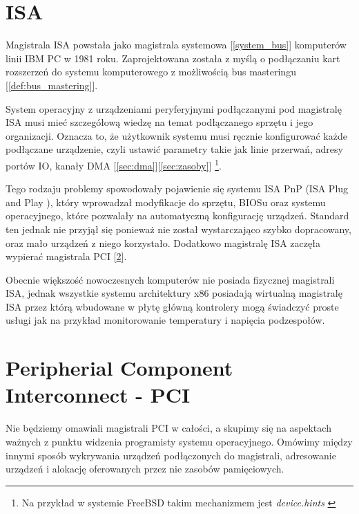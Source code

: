 \documentclass[shortabstract,inz]{iithesis}
\begin{document}
\section{ISA} %
\label{sec:isa}

Magistrala ISA \cite{def:wiki_isa} powstała jako magistrala systemowa [\ref{system_bus}] komputerów linii IBM PC w 1981 roku.
Zaprojektowana została z myślą o podłączaniu kart rozszerzeń do systemu komputerowego
z możliwością bus masteringu [\ref{def:bus_mastering}].

System operacyjny z urządzeniami peryferyjnymi podłączanymi pod magistralę ISA
musi mieć szczegółową wiedzę na temat podłączanego sprzętu i jego organizacji.
Oznacza to, że użytkownik systemu musi ręcznie konfigurować każde podłączane urządzenie,
czyli ustawić parametry takie jak linie przerwań, adresy portów IO, kanały DMA [\ref{sec:dma}][\ref{sec:zasoby}] 
\footnote{Na przykład w systemie FreeBSD takim mechanizmem jest \textit{device.hints} \cite{man:device.hints_5}}.


Tego rodzaju problemy spowodowały pojawienie się systemu ISA PnP (ISA Plug and Play \cite{def:wiki_legacy_pnp}),
który wprowadzał modyfikacje do sprzętu, BIOSu oraz systemu operacyjnego, które pozwalały
na automatyczną konfigurację urządzeń. Standard ten jednak nie przyjął się ponieważ
nie został wystarczająco szybko dopracowany, oraz mało urządzeń z niego korzystało.
Dodatkowo magistralę ISA zaczęła wypierać magistrala PCI [\ref{sec:pci}].

Obecnie większość nowoczesnych komputerów nie posiada fizycznej magistrali ISA,
jednak wszystkie systemu architektury x86 posiadają wirtualną magistralę ISA
przez którą wbudowane w płytę główną kontrolery mogą świadczyć proste 
usługi jak na przykład monitorowanie temperatury i napięcia podzespołów.

\section{Peripherial Component Interconnect - PCI} %
\label{sec:pci}


Nie będziemy omawiali magistrali PCI w całości, a skupimy się na
aspektach ważnych z punktu widzenia programisty systemu
operacyjnego. Omówimy między innymi sposób wykrywania urządzeń podłączonych do magistrali,
adresowanie urządzeń i alokację oferowanych przez nie zasobów pamięciowych.
\end{document}
